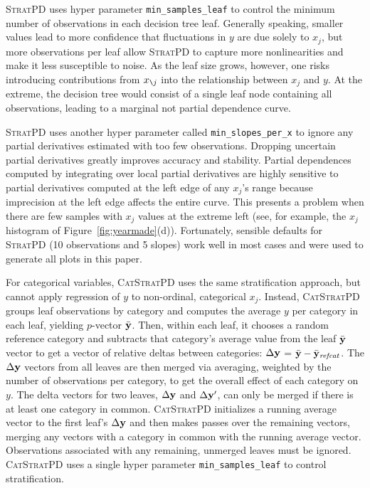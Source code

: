 \documentclass[]{article} %
\newcommand{\figref}[1]{Figure~\ref{#1}}
\newcommand{\spd}{\fontfamily{cmr}\textsc{\small StratPD}}
\newcommand{\cspd}{\fontfamily{cmr}\textsc{\small CatStratPD}}
\newcommand{\xnj}{$x_{\texttt{\char`\\} j}$}
\begin{document}
\spd{} uses hyper parameter {\tt\small min\_samples\_leaf} to control the minimum number of observations in each decision tree leaf.  Generally speaking, smaller values lead to more confidence that fluctuations in $y$ are due solely to $x_j$, but more observations per leaf allow \spd{} to capture more nonlinearities and make it less susceptible to noise.  As the leaf size grows, however, one risks introducing contributions from \xnj{} into the relationship between $x_j$ and $y$. At the extreme, the decision tree would consist of a single leaf node containing all observations, leading to a marginal not partial dependence curve.

\spd{} uses another hyper parameter called {\tt\small min\_slopes\_per\_x} to ignore any partial derivatives estimated with too few observations.  Dropping uncertain partial derivatives greatly improves accuracy and stability. Partial dependences computed by integrating over local partial derivatives are highly sensitive to partial derivatives computed at the left edge of any $x_j$'s range because imprecision at the left edge affects the entire curve.  This presents a problem when there are few samples with $x_j$ values at the extreme left (see, for example, the $x_j$ histogram of \figref{fig:yearmade}(d)).  Fortunately, sensible defaults for \spd{} (10 observations and 5 slopes) work well in most cases and  were used to generate all plots in this paper.

For categorical variables, \cspd{} uses the same stratification approach, but cannot apply  regression of $y$ to non-ordinal, categorical $x_j$. Instead, \cspd{} groups leaf observations by category and computes the average $y$ per category in each leaf, yielding $p$-vector $\bar{\bf y}$. Then,  within each leaf, it chooses a random reference category and subtracts that category's  average value from the leaf $\bar{\bf y}$ vector to get a vector of relative deltas between categories: $\Delta {\bf y}$ = $\bar{\bf y} - \bar{\bf y}_{\it refcat}$. The $\Delta  {\bf y}$ vectors from all leaves are then merged via averaging, weighted by the number of observations per category, to get the overall effect of each category on $y$.  The delta vectors for two leaves, $\Delta {\bf y}$ and $\Delta {\bf y}'$, can only be merged if there is at least one category in common.  \cspd{} initializes a running average vector to the first leaf's $\Delta  {\bf y}$ and then makes  passes over the remaining vectors, merging any vectors with a category in common with the running average vector.  Observations associated with any remaining, unmerged leaves must be ignored. \cspd{} uses a single hyper parameter {\tt\small min\_samples\_leaf} to control stratification. 
\end{document}
